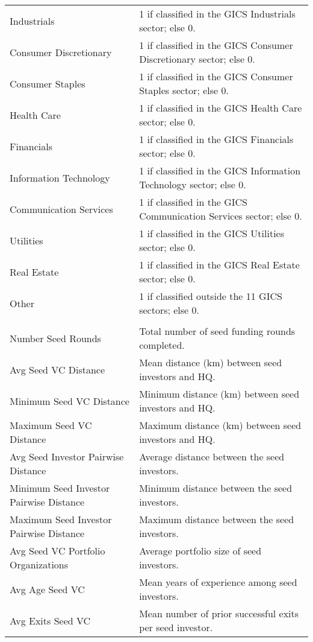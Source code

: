 {\begin{tabular}{p{} p{}}
Industrials & 1 if classified in the GICS Industrials sector; else 0. \\[0.4em]
Consumer Discretionary & 1 if classified in the GICS Consumer Discretionary sector; else 0. \\[0.4em]
Consumer Staples & 1 if classified in the GICS Consumer Staples sector; else 0. \\[0.4em]
Health Care & 1 if classified in the GICS Health Care sector; else 0. \\[0.4em]
Financials & 1 if classified in the GICS Financials sector; else 0. \\[0.4em]
Information Technology & 1 if classified in the GICS Information Technology sector; else 0. \\[0.4em]
Communication Services & 1 if classified in the GICS Communication Services sector; else 0. \\[0.4em]
Utilities & 1 if classified in the GICS Utilities sector; else 0. \\[0.4em]
Real Estate & 1 if classified in the GICS Real Estate sector; else 0. \\[0.4em]
Other & 1 if classified outside the 11 GICS sectors; else 0. \\[0.4em]
\addlinespace[0.5em]
\midrule
\multicolumn{2}{c}{\tiny\textsc{TREATMENT VARIABLES}} \\
\midrule
Number Seed Rounds & Total number of seed funding rounds completed. \\[0.4em]
Avg Seed VC Distance & Mean distance (km) between seed investors and HQ. \\[0.4em]
Minimum Seed VC Distance & Minimum distance (km) between seed investors and HQ. \\[0.4em]
Maximum Seed VC Distance & Maximum distance (km) between seed investors and HQ. \\[0.4em]
Avg Seed Investor Pairwise Distance & Average distance between the seed investors. \\[0.4em]
Minimum Seed Investor Pairwise Distance & Minimum distance between the seed investors. \\[0.4em]
Maximum Seed Investor Pairwise Distance & Maximum distance between the seed investors. \\[0.4em]
Avg Seed VC Portfolio Organizations & Average portfolio size of seed investors. \\[0.4em]
Avg Age Seed VC & Mean years of experience among seed investors. \\[0.4em]
Avg Exits Seed VC & Mean number of prior successful exits per seed investor. \\[0.4em]

\end{tabular}}

